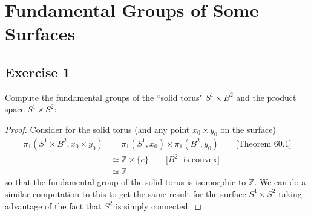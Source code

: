 \documentclass{article}
\begin{document}
\section{Fundamental Groups of Some Surfaces}

\subsection*{Exercise 1}

Compute the fundamental groups of the ``solid torus" $S^1\times B^2$ and the product space $S^1 \times S^2$:
\begin{proof}
	Consider for the solid torus (and any point $x_0\times y_0$ on the surface)
	\begin{align*}
		\pi_1(S^1 \times B^2, x_0\times y_0) &= \pi_1(S^1, x_0) \times \pi_1(B^2, y_0)\qquad\text{[Theorem 60.1]} \\
			&\simeq \mathbb{Z} \times \{e\}\qquad [B^2\;\text{ is convex]} \\
			&\simeq \mathbb{Z}
	\end{align*}
	so that the fundamental group of the solid torus is isomorphic to $\mathbb{Z}$. We can do a similar computation to this
	to get the same result for the surface $S^1\times S^2$ taking advantage of the fact that $S^2$ is simply connected.
\end{proof}
\end{document}
